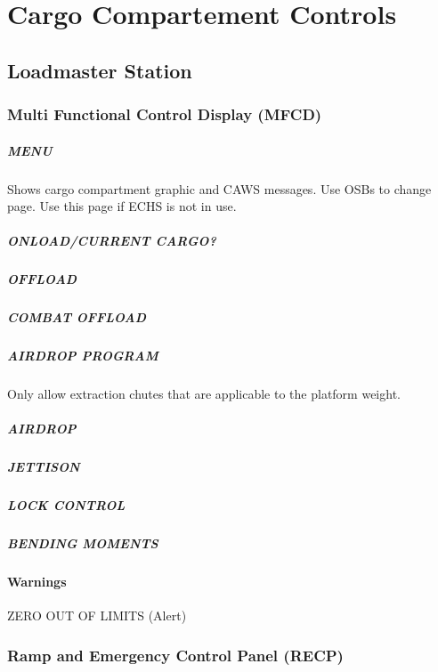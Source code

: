 \chapter{Cargo Compartement Controls}

\section{Loadmaster Station}

\subsection{Multi Functional Control Display (MFCD)}
\label{sec:mfcd}

\paragraph*{MENU}

Shows cargo compartment graphic and CAWS messages. Use \glspl{OSB} to change page. Use this page if \gls{ECHS} is not in use.

\paragraph*{ONLOAD/CURRENT CARGO?}

\paragraph*{OFFLOAD}

\paragraph*{COMBAT OFFLOAD}

\paragraph*{AIRDROP PROGRAM}

Only allow extraction chutes that are applicable to the platform weight.

\paragraph*{AIRDROP}

\paragraph*{JETTISON}

\paragraph*{LOCK CONTROL}

\paragraph*{BENDING MOMENTS}

\subsubsection{Warnings}
ZERO OUT OF LIMITS (Alert)

\subsection{Ramp and Emergency Control Panel (RECP)}
\label{sec:recp}

